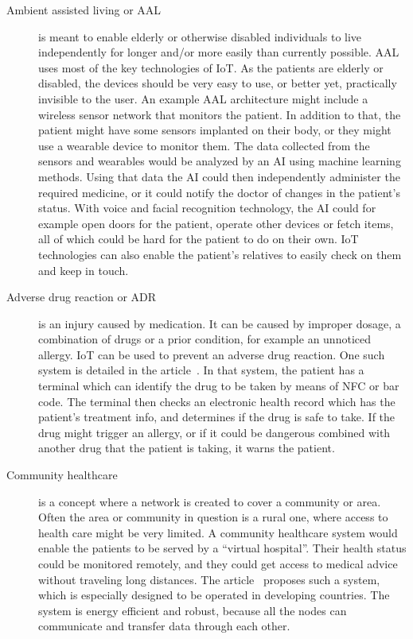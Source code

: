\begin{description}
  \item[Ambient assisted living or AAL] is meant to enable elderly or otherwise
    disabled individuals to live independently for longer and/or more easily
    than currently possible. AAL uses most of the key technologies of IoT. As
    the patients are elderly or disabled, the devices should be very easy to
    use, or better yet, practically invisible to the user. An example AAL
    architecture might include a wireless sensor network that monitors the
    patient. In addition to that, the patient might have some sensors implanted
    on their body, or they might use a wearable device to monitor them. The
    data collected from the sensors and wearables would be analyzed by an AI
    using machine learning methods. Using that data the AI could then
    independently administer the required medicine, or it could notify the
    doctor of changes in the patient's status. With voice and facial
    recognition technology, the AI could for example open doors for the
    patient, operate other devices or fetch items, all of which could be hard
    for the patient to do on their own. IoT technologies can also enable the
    patient's relatives to easily check on them and keep in
    touch.~\cite{Istepanian2011}

  \item[Adverse drug reaction or ADR] is an injury caused by medication. It can
    be caused by improper dosage, a combination of drugs or a prior condition,
    for example an unnoticed allergy. IoT can be used to prevent an adverse
    drug reaction. One such system is detailed in the article~\cite{Jara2010}.
    In that system, the patient has a terminal which can identify the drug to
    be taken by means of NFC or bar code. The terminal then checks an electronic
    health record which has the patient's treatment info, and determines if the
    drug is safe to take. If the drug might trigger an allergy, or if it could
    be dangerous combined with another drug that the patient is taking, it
    warns the patient.

  \item[Community healthcare] is a concept where a network is created to cover
    a community or area. Often the area or community in question is a rural
    one, where access to health care might be very limited. A community
    healthcare system would enable the patients to be served by a ``virtual
    hospital''. Their health status could be monitored remotely, and they could
    get access to medical advice without traveling long distances. The
    article~\cite{Rohokale2011} proposes such a system, which is especially
    designed to be operated in developing countries. The system is energy
    efficient and robust, because all the nodes can communicate and transfer
    data through each other.

\end{description}

